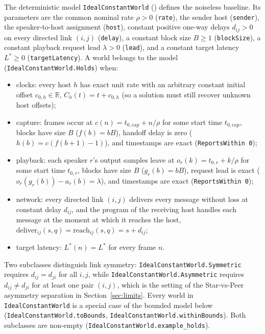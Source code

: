 \documentclass[11pt,a4paper]{article}
\newcommand{\lean}[1]{\texttt{#1}}
\newcommand{\R}{\mathbb{R}}
\theoremstyle{definition}
\begin{document}
The deterministic model \lean{IdealConstantWorld}
() defines the noiseless baseline.
Its parameters are the common nominal rate $\rho > 0$ (\lean{rate}), the
sender host (\lean{sender}), the speaker-to-host assignment (\lean{host}),
constant positive one-way delays $d_{ij} > 0$ on every directed link
$(i, j)$ (\lean{delay}), a constant block size $B \ge 1$ (\lean{blockSize}),
a constant playback request lead $\lambda > 0$ (\lean{lead}), and a constant
target latency $L^* \ge 0$ (\lean{targetLatency}). A world belongs to the
model (\lean{IdealConstantWorld.Holds}) when:
\begin{itemize}
\item clocks: every host $h$ has exact unit rate with an arbitrary constant
  initial offset $c_{0,h} \in \R$, $C_h(t) = t + c_{0,h}$ (so a solution
  must still recover unknown host offsets);
\item capture: frames occur at $c(n) = t_{0,\mathrm{cap}} + n/\rho$ for some
  start time $t_{0,\mathrm{cap}}$, blocks have size $B$ ($f(b) = bB$),
  handoff delay is zero ($h(b) = c(f(b+1)-1)$), and timestamps are exact
  (\lean{ReportsWithin 0});
\item playback: each speaker $r$'s output samples leave at
  $o_r(k) = t_{0,r} + k/\rho$ for some start time $t_{0,r}$, blocks have
  size $B$ ($g_r(b) = bB$), request lead is exact
  ($o_r(g_r(b)) - a_r(b) = \lambda$), and timestamps are exact
  (\lean{ReportsWithin 0});
\item network: every directed link $(i, j)$ delivers every message without
  loss at constant delay $d_{ij}$, and the program of the receiving host
  handles each message at the moment at which it reaches the host,
  $\mathrm{deliver}_{ij}(s, q) = \mathrm{reach}_{ij}(s, q) = s + d_{ij}$;
\item target latency: $L^*(n) = L^*$ for every frame $n$.
\end{itemize}
Two subclasses distinguish link symmetry:
\lean{IdealConstantWorld.\allowbreak Symmetric} requires $d_{ij} = d_{ji}$
for all $i, j$, while \lean{IdealConstantWorld.\allowbreak Asymmetric}
requires $d_{ij} \ne d_{ji}$ for at least one pair $(i, j)$, which is the
setting of the Star-vs-Peer asymmetry separation in
Section~\ref{sec:limits}. Every world in \lean{IdealConstantWorld} is a
special case of the bounded model below
(\lean{IdealConstantWorld.\allowbreak toBounds},
\lean{IdealConstantWorld.\allowbreak withinBounds}). Both subclasses are
non-empty (\lean{IdealConstantWorld.\allowbreak example\_\allowbreak holds}).
\end{document}
